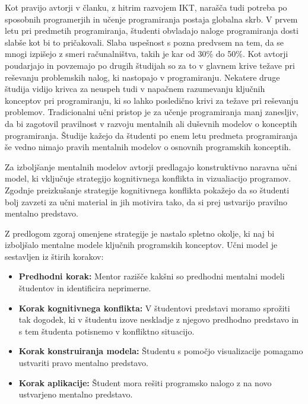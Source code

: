 
Kot pravijo avtorji v članku, z hitrim razvojem IKT, narašča tudi
potreba po sposobnih programerjih in učenje programiranja postaja
globalna skrb. V prvem letu pri predmetih programiranja, študenti
obvladajo naloge programiranja dosti slabše kot bi to
pričakovali. Slaba uspešnost s pozna predvsem na tem, da se mnogi
izpišejo z smeri računalništva, takih je kar od 30\% do 50\%. Kot
avtorji poudarjajo in povzemajo po drugih študijah so za to v glavnem
krive težave pri reševanju problemskih nalog, ki nastopajo v
programiranju. Nekatere druge študija vidijo krivca za neuspeh tudi v
napačnem razumevanju ključnih konceptov pri programiranju, ki so lahko
posledično krivi za težave pri reševanju problemov. Tradicionalni učni
pristop je za učenje programiranja manj zanesljiv, da bi zagotovil
pravilnost v razvoju mentalnih ali duševnih modelov o
konceptih programiranja. Študije kažejo da študenti po enem letu
predmeta programiranja še vedno nimajo pravih mentalnih modelov o
osnovnih programskih konceptih.

Za izboljšanje mentalnih modelov avtorji predlagajo konstruktivno
naravna učni model, ki vključuje strategijo kognitivnega konflikta in
vizualiacijo programov. Zgodnje preizkušanje strategije kognitivnega
konflikta pokažejo da so študenti bolj zavzeti za učni material in
jih motivira tako, da si prej ustvarijo pravilno mentalno predstavo.

Z predlogom zgoraj omenjene strategije je nastalo spletno okolje, ki
naj bi izboljšalo mentalne modele ključnih programskih konceptov. Učni
model je sestavljen iz štirih korakov:

\begin{itemize}
\item \textbf{Predhodni korak:} Mentor razišče kakšni so predhodni
 mentalni modeli študentov in identificira neprimerne.
\item \textbf{Korak kognitivnega konflikta:} V študentovi predstavi
  moramo sprožiti tak dogodek, ki v študentu izove neskladje z njegovo
  predhodno predstavo in s tem študenta potisnemo v konfliktno
  situacijo.
\item \textbf{Korak konstruiranja modela:} Študentu s pomočjo
  visualizacije pomagamo ustvariti pravo mentalno predstavo.
\item \textbf{Korak aplikacije: } Študent mora rešiti programsko
  nalogo z na novo ustvarjeno mentalno predstavo.
\end{itemize}

